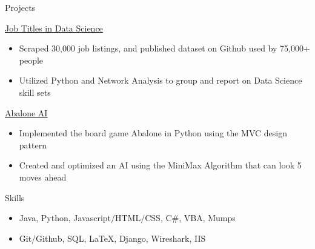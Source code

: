 
	\begin{cvsection}{Projects}
		\begin{cvsubsection}{\href{https://github.com/picklesueat/data_jobs_data}{\underline{Job Titles in Data Science}}}{}{}
			\begin{itemize}
				\item   Scraped 30,000 job listings, and published dataset on Github used by 75,000+ people
				\item Utilized Python and Network Analysis to group and report on Data Science skill sets
			\end{itemize}
		\end{cvsubsection}
		\begin{cvsubsection}{\href{https://github.com/picklesueat/Abalone}{\underline{Abalone AI}}}{}{}
			\begin{itemize}
				\item   Implemented the board game Abalone in Python using the MVC design pattern
				\item Created and optimized an AI using the MiniMax Algorithm that can look 5 moves ahead
			\end{itemize}
		\end{cvsubsection}
	\end{cvsection}
		


\begin{cvsection}{Skills}
	\begin{cvsubsection}{}{}{}	
		\begin{itemize}
			\item Java, Python, Javascript$/$HTML$/$CSS, C\#, VBA, Mumps
			\item  Git/Github, SQL, LaTeX, Django, Wireshark, IIS
		\end{itemize}
	\end{cvsubsection}
\end{cvsection}